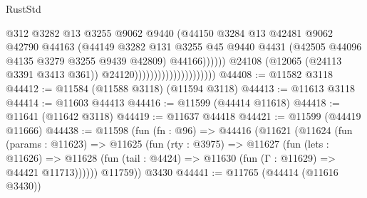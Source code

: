 \begin{lexlean}{RustStd}
\begin{coremodule}
                                                      @312
                                                      @3282
                                                      @13
                                                      @3255
                                                      @9062
                                                      @9440
                                                      (@44150
                                                        @3284
                                                        @13
                                                        @42481
                                                        @9062
                                                        @42790
                                                        @44163
                                                        (@44149
                                                          @3282
                                                          @131
                                                          @3255
                                                          @45
                                                          @9440
                                                          @4431
                                                          (@42505
                                                            @44096
                                                            @4135
                                                            @3279
                                                            @3255
                                                            @9439
                                                            @42809)
                                                          @44166))))))
                                              @24108
                                              (@12065 (@24113 @3391 @3413 @361))
                                              @24120)))))))))))))))))))))
@44408 := @11582 @3118
@44412 := @11584 (@11588 @3118) (@11594 @3118)
@44413 := @11613 @3118
@44414 := @11603 @44413
@44416 := @11599 (@44414 @11618)
@44418 := @11641 (@11642 @3118)
@44419 := @11637 @44418
@44421 := @11599 (@44419 @11666)
@44438 := @11598
    (fun (fn : @96) =>
    @44416
      (@11621
        (@11624
          (fun (params : @11623) =>
          @11625
            (fun (rty : @3975) =>
            @11627
              (fun (lets : @11626) =>
              @11628 (fun (tail : @4424) => @11630 (fun (Γ : @11629) => @44421 @11713))))))
        @11759))
    @3430
@44441 := @11765 (@44414 (@11616 @3430))

\end{coremodule}
\end{lexlean}
